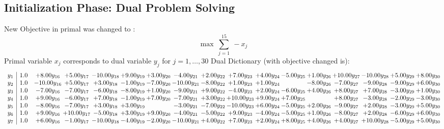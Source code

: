 \documentclass[9pt]{article}
\begin{document}
\subsection{Initialization Phase: Dual Problem Solving}
New Objective in primal was changed to : \[ \max\ \sum_{j=1}^{15}\ - x_j \] 
Primal variable $x_j$ corresponds to dual variable $y_j$ for $j = 1,\ldots,30$
Dual Dictionary (with objective changed is): 
\[\begin{array}{c| c c@{\hskip 2pt} c@{\hskip 2pt} c@{\hskip 2pt} c@{\hskip 2pt} c@{\hskip 2pt} c@{\hskip 2pt} c@{\hskip 2pt} c@{\hskip 2pt} c@{\hskip 2pt} c@{\hskip 2pt} c@{\hskip 2pt} c@{\hskip 2pt} c@{\hskip 2pt} c@{\hskip 2pt} c@{\hskip 2pt} }
 y_{1}   &  1.0 & +  8.00 y_{16} & +  5.00 y_{17} & -10.00 y_{18} & +  9.00 y_{19} & +  3.00 y_{20} & -4.00 y_{21} & +  2.00 y_{22} & +  7.00 y_{23} & +  4.00 y_{24} & -5.00 y_{25} & +  1.00 y_{26} & + 10.00 y_{27} & -10.00 y_{28} & +  5.00 y_{29} & +  8.00 y_{30}\\
 y_{2}   &  1.0 & -10.00 y_{16} & +  5.00 y_{17} & +  3.00 y_{18} & -1.00 y_{19} & -7.00 y_{20} & -10.00 y_{21} & -8.00 y_{22} & +  1.00 y_{23} & +  1.00 y_{24} &   & -8.00 y_{26} & -7.00 y_{27} & -9.00 y_{28} & -9.00 y_{29} & +  6.00 y_{30}\\
 y_{3}   &  1.0 & -7.00 y_{16} & -7.00 y_{17} & -6.00 y_{18} & -8.00 y_{19} & +  1.00 y_{20} & -9.00 y_{21} & +  9.00 y_{22} & -4.00 y_{23} & +  2.00 y_{24} & -6.00 y_{25} & +  4.00 y_{26} & +  8.00 y_{27} & +  7.00 y_{28} & -3.00 y_{29} & +  1.00 y_{30}\\
 y_{4}   &  1.0 & +  9.00 y_{16} & -6.00 y_{17} & +  7.00 y_{18} & -1.00 y_{19} & +  7.00 y_{20} & -7.00 y_{21} & +  3.00 y_{22} & + 10.00 y_{23} & +  9.00 y_{24} & +  7.00 y_{25} &   & +  8.00 y_{27} & -3.00 y_{28} & -2.00 y_{29} & -3.00 y_{30}\\
 y_{5}   &  1.0 & -8.00 y_{16} & -7.00 y_{17} & +  3.00 y_{18} & +  3.00 y_{19} &   & -3.00 y_{21} & -7.00 y_{22} & -10.00 y_{23} & +  6.00 y_{24} & -5.00 y_{25} & +  2.00 y_{26} & -9.00 y_{27} & +  2.00 y_{28} & -3.00 y_{29} & +  5.00 y_{30}\\
 y_{6}   &  1.0 & +  9.00 y_{16} & + 10.00 y_{17} & -5.00 y_{18} & +  3.00 y_{19} & +  9.00 y_{20} & -4.00 y_{21} & -5.00 y_{22} & +  9.00 y_{23} & -4.00 y_{24} & -5.00 y_{25} & +  1.00 y_{26} & -8.00 y_{27} & +  2.00 y_{28} & -6.00 y_{29} & +  6.00 y_{30}\\
 y_{7}   &  1.0 & +  6.00 y_{16} & -1.00 y_{17} & -10.00 y_{18} & -4.00 y_{19} & -2.00 y_{20} & -10.00 y_{21} & +  4.00 y_{22} & +  7.00 y_{23} & +  2.00 y_{24} & +  8.00 y_{25} & +  4.00 y_{26} & +  4.00 y_{27} & + 10.00 y_{28} & -5.00 y_{29} & +  5.00 y_{30}\\

\end{array}\]
\end{document}

